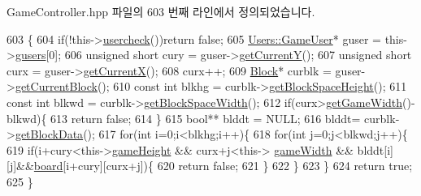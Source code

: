Game\+Controller.\+hpp 파일의 603 번째 라인에서 정의되었습니다.


\begin{DoxyCode}
603                                \{
604                 \textcolor{keywordflow}{if}(!this->\hyperlink{class_tetris_1_1_game_controller_ab96e22daad51119b35cbee8cfb7385ef}{usercheck}())\textcolor{keywordflow}{return} \textcolor{keyword}{false};
605                 \hyperlink{class_tetris_1_1_users_1_1_game_user}{Users::GameUser}* guser = this->\hyperlink{class_tetris_1_1_game_controller_a1a31d3a933daad6d95e20458eea2900e}{gusers}[0];
606                 \textcolor{keywordtype}{unsigned} \textcolor{keywordtype}{short} cury = guser->\hyperlink{class_tetris_1_1_users_1_1_game_user_af5bd7ff0b575af1b42b093488cff97e2}{getCurrentY}();
607                 \textcolor{keywordtype}{unsigned} \textcolor{keywordtype}{short} curx = guser->\hyperlink{class_tetris_1_1_users_1_1_game_user_ad25eace96bd27ae6df4a0c0d506be730}{getCurrentX}();
608                 curx++;
609                 \hyperlink{class_tetris_1_1_block}{Block}* curblk = guser->\hyperlink{class_tetris_1_1_users_1_1_game_user_a3d4bcc74d518c28356012f8a42b85896}{getCurrentBlock}();
610                 \textcolor{keyword}{const} \textcolor{keywordtype}{int} blkhg = curblk->\hyperlink{class_tetris_1_1_block_a5301977e32c03aaf122fa289fcba77ba}{getBlockSpaceHeight}();
611                 \textcolor{keyword}{const} \textcolor{keywordtype}{int} blkwd = curblk->\hyperlink{class_tetris_1_1_block_ac390e14de476582300d815d9054ed9bd}{getBlockSpaceWidth}();
612                 \textcolor{keywordflow}{if}(curx>\hyperlink{class_tetris_1_1_game_controller_a256cff75224efe165e1c5409c69b0503}{getGameWidth}()-blkwd)\{
613                     \textcolor{keywordflow}{return} \textcolor{keyword}{false};
614                 \}
615                 \textcolor{keywordtype}{bool}** blddt = NULL;
616              blddt= curblk->\hyperlink{class_tetris_1_1_block_a9bd2c3d6ccacff9a5f56f72336ba324f}{getBlockData}();
617              \textcolor{keywordflow}{for}(\textcolor{keywordtype}{int} i=0;i<blkhg;i++)\{
618                     \textcolor{keywordflow}{for}(\textcolor{keywordtype}{int} j=0;j<blkwd;j++)\{
619                         \textcolor{keywordflow}{if}(i+cury<this->\hyperlink{class_tetris_1_1_game_controller_a8e3adc647ed382de0ff541417bea9b33}{gameHeight} && curx+j<this->
      \hyperlink{class_tetris_1_1_game_controller_a439f215918db4127fcb44cf9d501ed63}{gameWidth} && blddt[i][j]&&\hyperlink{class_tetris_1_1_game_controller_a7725b6cec9459a6bffaa3e29dd1c5196}{board}[i+cury][curx+j])\{
620                             \textcolor{keywordflow}{return} \textcolor{keyword}{false};
621                         \}
622                     \}
623                 \}
624                 \textcolor{keywordflow}{return} \textcolor{keyword}{true};
625             \}
\end{DoxyCode}
